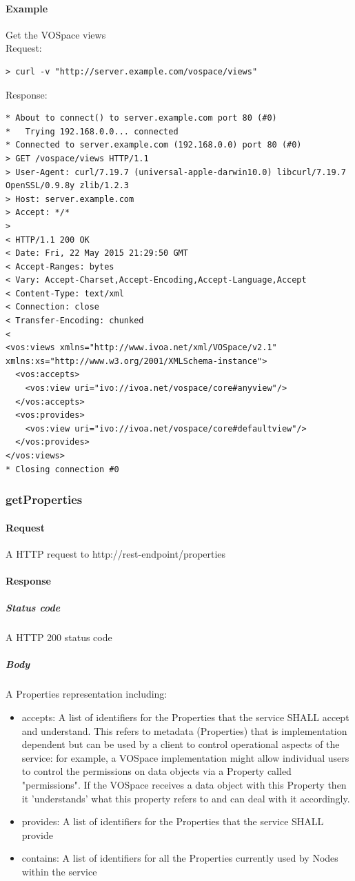 \documentclass[11pt,a4paper]{ivoa}
\begin{document}
\paragraph{Example}
Get the VOSpace views
\\[5px]
\noindent
Request:
\begin{lstlisting}
> curl -v "http://server.example.com/vospace/views"
\end{lstlisting}
Response:
\begin{lstlisting}
* About to connect() to server.example.com port 80 (#0)
*   Trying 192.168.0.0... connected
* Connected to server.example.com (192.168.0.0) port 80 (#0)
> GET /vospace/views HTTP/1.1
> User-Agent: curl/7.19.7 (universal-apple-darwin10.0) libcurl/7.19.7 OpenSSL/0.9.8y zlib/1.2.3
> Host: server.example.com
> Accept: */*
>
< HTTP/1.1 200 OK
< Date: Fri, 22 May 2015 21:29:50 GMT
< Accept-Ranges: bytes
< Vary: Accept-Charset,Accept-Encoding,Accept-Language,Accept
< Content-Type: text/xml
< Connection: close
< Transfer-Encoding: chunked
<
<vos:views xmlns="http://www.ivoa.net/xml/VOSpace/v2.1" xmlns:xs="http://www.w3.org/2001/XMLSchema-instance">
  <vos:accepts>
    <vos:view uri="ivo://ivoa.net/vospace/core#anyview"/>
  </vos:accepts>
  <vos:provides>
    <vos:view uri="ivo://ivoa.net/vospace/core#defaultview"/>
  </vos:provides>
</vos:views>
* Closing connection #0
\end{lstlisting}

\subsubsection{getProperties}
\label{subsubsec:getproperties}

\paragraph{Request}
A HTTP request to http://rest-endpoint/properties

\paragraph{Response}
\subparagraph{Status code} A HTTP 200 status code
\subparagraph{Body}
A Properties representation including:
\begin{itemize}
    \item accepts: A list of identifiers for the Properties that the service SHALL accept and understand. This refers to metadata (Properties) that is implementation dependent but can be used by a client to control operational aspects of the service: for example, a VOSpace implementation might allow individual users to control the permissions on data objects via a Property called "permissions". If the VOSpace receives a data object with this Property then it 'understands' what this property refers to and can deal with it accordingly.
    \item provides: A list of identifiers for the Properties that the service SHALL provide
    \item contains: A list of identifiers for all the Properties currently used by Nodes within the service
\end{itemize}
\end{document}

